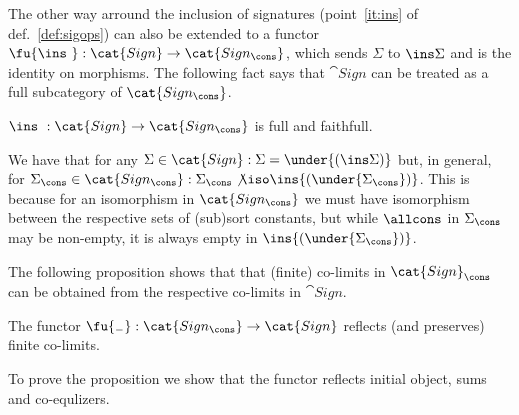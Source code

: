 The other way arround the inclusion of signatures (point~\ref{it:ins} of
def.~\ref{def:sigops}) can also be extended to a
functor $\fu{\ins\ }:\cat{Sign} \to \cat{Sign_\cons}$, which sends $\Sigma$
to $\ins\Sigma$ and is the identity on morphisms. The following fact says
that $\cat{Sign}$ can be treated as a full subcategory of $\cat{Sign_\cons}$.

\begin{fact}
$\ins\ :\cat{Sign} \to \cat{Sign_\cons}$ is full and faithfull.
\end{fact}
We have that for any $\Sigma\in\cat{Sign}:\Sigma=\under{(\ins\Sigma)}$ but,
in general, for $\Sigma_\cons\in\cat{Sign_\cons}: \Sigma_\cons\not\iso
\ins{(\under{\Sigma_\cons})}$. This is because for an isomorphism in
$\cat{Sign_\cons}$ we must have isomorphism between the respective sets of
(sub)sort constants, but while $\allcons$ in $\Sigma_\cons$ may be
non-empty, it is always empty in $\ins{(\under{\Sigma_\cons})}$.

%
The following proposition shows that
 that (finite) co-limits in $\cat{Sign}_\cons$
can be obtained from the respective co-limits in $\cat{Sign}$. 

\begin{proposition}\label{prop:finco}
The functor $\fu{_-}:\cat{Sign_\cons} \to \cat{Sign}$ reflects (and
preserves) finite co-limits.
\end{proposition}
%
To prove the proposition we show that the functor reflects initial object, sums and co-equlizers.

